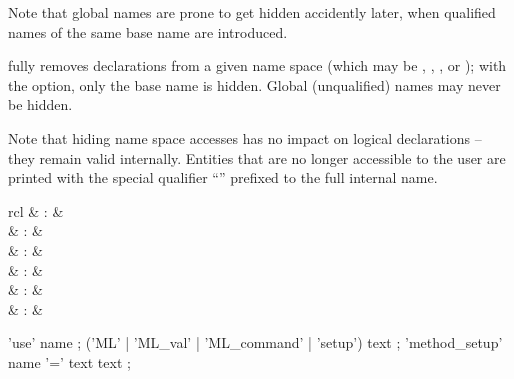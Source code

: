 \begin{isabellebody}
\begin{isamarkuptext}
\begin{descr}
  Note that global names are prone to get hidden accidently later,
  when qualified names of the same base name are introduced.
  
  \item [\mbox{\isa{\isacommand{hide}}}~\isa{{\isachardoublequote}space\ names{\isachardoublequote}}] fully removes
  declarations from a given name space (which may be ,
  , , or ); with the  option, only the base name is hidden.  Global
  (unqualified) names may never be hidden.
  
  Note that hiding name space accesses has no impact on logical
  declarations -- they remain valid internally.  Entities that are no
  longer accessible to the user are printed with the special qualifier
  ``\isa{{\isachardoublequote}{\isacharquery}{\isacharquery}{\isachardoublequote}}'' prefixed to the full internal name.

  \end{descr}%
\end{isamarkuptext}%
\isamarkuptrue%
%
\isamarkuptrue%
%
\begin{isamarkuptext}%
\begin{matharray}{rcl}
    \mbox{} & : &  \\
    \mbox{} & : &  \\
    \mbox{} & : & \isartrans{\cdot}{\cdot} \\
    \mbox{} & : & \isartrans{\cdot}{\cdot} \\
    \mbox{} & : &  \\
    \mbox{} & : &  \\
  \end{matharray}

  \begin{rail}
    'use' name
    ;
    ('ML' | 'ML\_val' | 'ML\_command' | 'setup') text
    ;
    'method\_setup' name '=' text text
    ;
  \end{rail}


\end{isamarkuptext}
\end{isabellebody}
